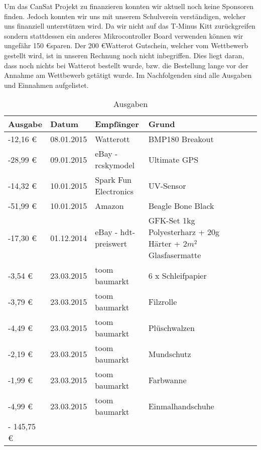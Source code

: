 Um das CanSat Projekt zu finanzieren konnten wir aktuell noch keine Sponsoren finden. Jedoch konnten wir uns mit unserem Schulverein verständigen, welcher uns finanziell unterstützen wird. Da wir nicht auf das T-Minus Kitt zurückgreifen sondern stattdessen ein anderes Mikrocontroller Board verwenden können wir ungefähr 150  \euro  sparen. Der 200 \euro Watterot Gutschein, welcher vom Wettbewerb gestellt wird, ist in unseren Rechnung noch nicht inbegriffen. Dies liegt daran, dass noch nichts bei Watterot bestellt wurde, bzw. die Bestellung lange vor der Annahme am Wettbewerb getätigt wurde.
Im Nachfolgenden sind alle Ausgaben und Einnahmen aufgelistet.
\begin{table}[htbp]
  \centering
  \caption{Ausgaben}
    \begin{tabular}{p{}p{}p{}p{}rrrl}
    \toprule
    \textbf{Ausgabe} & \textbf{Datum} & \textbf{Empfänger} & \textbf{Grund} \\
    \midrule
    -12,16 \euro  & 08.01.2015 & Watterott & BMP180 Breakout \\
    -28,99 \euro  & 09.01.2015 & eBay - rcskymodel & Ultimate GPS \\
    -14,32 \euro  & 10.01.2015 & Spark Fun Electronics & UV-Sensor \\
    -51,99 \euro  & 10.01.2015 & Amazon & Beagle Bone Black \\
    -17,30 \euro  & 01.12.2014 & eBay - hdt-preiswert & 
GFK-Set 1kg Polyesterharz + 20g Härter + $2m^2$ Glasfasermatte \\
    -3,54 \euro  & 23.03.2015 & toom baumarkt & 6 x Schleifpapier \\
    -3,79 \euro  & 23.03.2015 & toom baumarkt & Filzrolle \\
    -4,49 \euro  & 23.03.2015 & toom baumarkt & Plüschwalzen \\
    -2,19 \euro  & 23.03.2015 & toom baumarkt & Mundschutz \\
    -1,99 \euro  & 23.03.2015 & toom baumarkt & Farbwanne \\
    -4,99 \euro  & 23.03.2015 & toom baumarkt & Einmalhandschuhe \\
    \bottomrule
    - 145,75 \euro & & & \\
    \bottomrule
    \end{tabular}%
  \label{tab:budgetausgaben}%
\end{table}%

